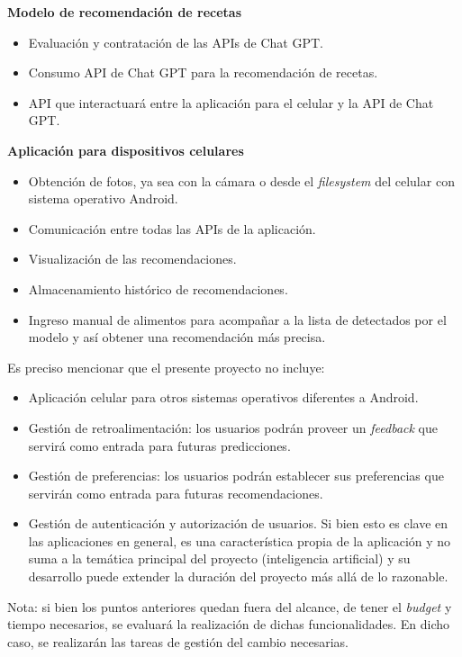 \documentclass[
11pt, %
]{charter}
\begin{document}
\textbf{Modelo de recomendación de recetas}
\begin{itemize}
	\item Evaluación y contratación de las APIs de Chat GPT.
	\item Consumo API de Chat GPT para la recomendación de recetas.
	\item API que interactuará entre la aplicación para el celular y la API de Chat GPT.
\end{itemize}


\textbf{Aplicación para dispositivos celulares}
\begin{itemize}
	\item Obtención de fotos, ya sea con la cámara o desde el \textit{filesystem} del celular con sistema operativo Android.
	\item Comunicación entre todas las APIs de la aplicación.
	\item Visualización de las recomendaciones.
	\item Almacenamiento histórico de recomendaciones.
	\item Ingreso manual de alimentos para acompañar a la lista de detectados por el modelo y así obtener una recomendación más precisa.
\end{itemize}



Es preciso mencionar que el presente proyecto no incluye:
\begin{itemize}
	\item Aplicación celular para otros sistemas operativos diferentes a Android.
	\item Gestión de retroalimentación: los usuarios podrán proveer un \textit{feedback} que servirá como entrada para futuras predicciones.
	\item Gestión de preferencias: los usuarios podrán establecer sus preferencias que servirán como entrada para futuras recomendaciones.
	\item Gestión de autenticación y autorización de usuarios. Si bien esto es clave en las aplicaciones en general, es una característica propia de la aplicación y no suma a la temática principal del proyecto (inteligencia artificial) y su desarrollo puede extender la duración del proyecto más allá de lo razonable.
	
\end{itemize}
Nota: si bien los puntos anteriores quedan fuera del alcance, de tener el \textit{budget} y tiempo necesarios, se evaluará la realización de dichas funcionalidades. En dicho caso, se realizarán las tareas de gestión del cambio necesarias.
\end{document}
